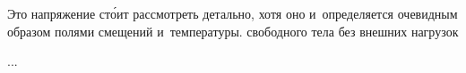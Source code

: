 \begin{otherlanguage}{russian}

Это напряжение ст\'{о}ит рассмотреть детально, хотя оно и~определяется очевидным образом полями смещений и~температуры.
свободного тела без внешних нагрузок

...



\end{otherlanguage}



\label{para:variationalformulations.thermoelasticity}


